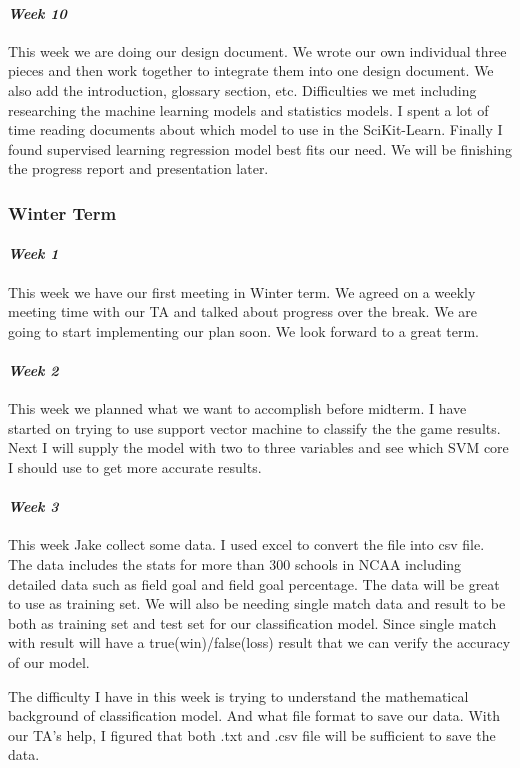 \documentclass[onecolumn, draftclsnofoot,10pt, compsoc]{IEEEtran}
\begin{document}
\paragraph{\emph{Week 10}}
This week we are doing our design document. We wrote our own individual three pieces and then work together to integrate them into one design document. We also add the introduction, glossary section, etc. Difficulties we met including researching the machine learning models and statistics models. I spent a lot of time reading documents about which model to use in the SciKit-Learn. Finally I found supervised learning regression model best fits our need. We will be finishing the progress report and presentation later.
\subsubsection{Winter Term}
\paragraph{\emph{Week 1}}
This week we have our first meeting in Winter term. We agreed on a weekly meeting time with our TA and talked about progress over the break. We are going to start implementing our plan soon. We look forward to a great term.
\paragraph{\emph{Week 2}}
This week we planned what we want to accomplish before midterm. I have started on trying to use support vector machine to classify the the game results. Next I will supply the model with two to three variables and see which SVM core I should use to get more accurate results.
\paragraph{\emph{Week 3}}
This week Jake collect some data. I used excel to convert the file into csv file. The data includes the stats for more than 300 schools in NCAA including detailed data such as field goal and field goal percentage. The data will be great to use as training set. We will also be needing single match data and result to be both as training set and test set for our classification model. Since single match with result will have a true(win)/false(loss) result that we can verify the accuracy of our model.

The difficulty I have in this week is trying to understand the mathematical background of classification model. And what file format to save our data. With our TA's help, I figured that both .txt and .csv file will be sufficient to save the data.
\end{document}

